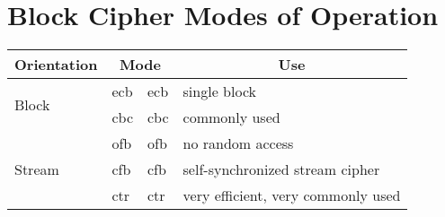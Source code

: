 \documentclass[draft]{article}
\begin{document}
\section{Block Cipher Modes of Operation}
\begin{center}\begin{tabular}{llll}
        \multicolumn{1}{c}{Orientation} & \multicolumn{2}{c}{Mode} & \multicolumn{1}{c}{Use}                                      \\\toprule
        \multirow{2}{*}{Block}          & \acrshort{ecb}           & \acrlong{ecb}           & single block                       \\
                                        & \acrshort{cbc}           & \acrlong{cbc}           & commonly used                      \\\midrule
        \multirow{3}{*}{Stream}         & \acrshort{ofb}           & \acrlong{ofb}           & no random access                   \\
                                        & \acrshort{cfb}           & \acrlong{cfb}           & self-synchronized stream cipher    \\
                                        & \acrshort{ctr}           & \acrlong{ctr}           & very efficient, very commonly used \\\bottomrule
    \end{tabular}
\end{center}
\vspace*{0.25in}
\end{document}
